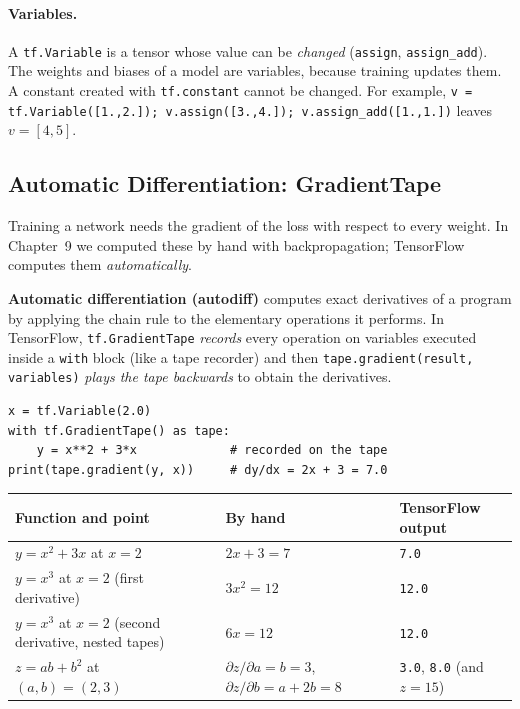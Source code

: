 \paragraph{Variables.} A \texttt{tf.Variable} is a tensor whose value can be \emph{changed} (\texttt{assign}, \texttt{assign\_add}). The weights and biases of a model are variables, because training updates them. A constant created with \texttt{tf.constant} cannot be changed. For example, \texttt{v = tf.Variable([1.,2.]); v.assign([3.,4.]); v.assign\_add([1.,1.])} leaves $v=[4,5]$.

\subsection{Automatic Differentiation: GradientTape}

Training a network needs the gradient of the loss with respect to every weight. In Chapter~9 we computed these by hand with backpropagation; TensorFlow computes them \emph{automatically}.

\begin{definition}
\textbf{Automatic differentiation (autodiff)} computes exact derivatives of a program by applying the chain rule to the elementary operations it performs. In TensorFlow, \texttt{tf.GradientTape} \emph{records} every operation on variables executed inside a \texttt{with} block (like a tape recorder) and then \texttt{tape.gradient(result, variables)} \emph{plays the tape backwards} to obtain the derivatives.
\end{definition}

\begin{lstlisting}
x = tf.Variable(2.0)
with tf.GradientTape() as tape:
    y = x**2 + 3*x             # recorded on the tape
print(tape.gradient(y, x))     # dy/dx = 2x + 3 = 7.0
\end{lstlisting}

\begin{center}
\begin{tabular}{@{}p{5.1cm}p{3.8cm}p{4.2cm}@{}}
\toprule
\textbf{Function and point} & \textbf{By hand} & \textbf{TensorFlow output}\\
\midrule
$y=x^2+3x$ at $x=2$ & $2x+3=7$ & \texttt{7.0}\\
$y=x^3$ at $x=2$ (first derivative) & $3x^2=12$ & \texttt{12.0}\\
$y=x^3$ at $x=2$ (second derivative, nested tapes) & $6x=12$ & \texttt{12.0}\\
$z=ab+b^2$ at $(a,b)=(2,3)$ & $\partial z/\partial a=b=3$, $\partial z/\partial b=a+2b=8$ & \texttt{3.0}, \texttt{8.0} (and $z=15$)\\
\bottomrule
\end{tabular}
\end{center}

